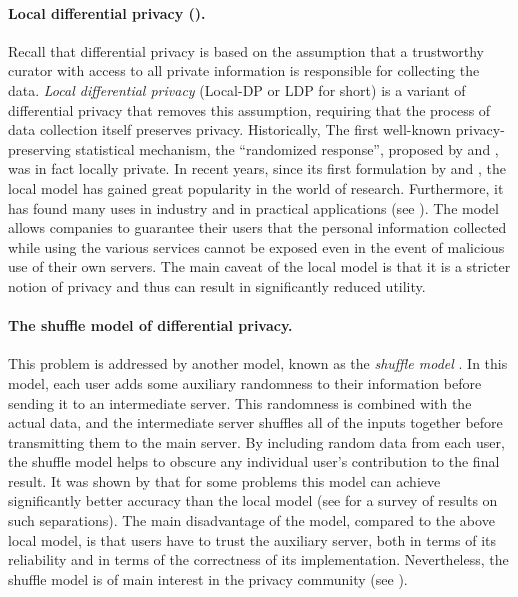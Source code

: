\documentclass[12pt,a4paper,oneside,onecolumn]{book}
\begin{document}
%
%

\paragraph{Local differential privacy (\citet{KLNRS08}).}
Recall that differential privacy is based on the assumption that a trustworthy curator with access to all private information is responsible for collecting the data. \emph{Local differential privacy} (Local-DP or LDP for short) is a variant of differential privacy that removes this assumption, requiring that the process of data collection itself preserves privacy. 
Historically, The first well-known privacy-preserving statistical mechanism, the “randomized response”, proposed by \citet{warner1965randomized} and \citet{greenberg1969unrelated}, was in fact locally private. 
In recent years, since its first formulation by \citet{10.1145/773153.773174} and \citet{KLNRS08}, the local model has gained great popularity in the world of research. 
Furthermore, it has found many uses in industry and in practical applications (see \citet{pmlr-v119-acharya20a, bureau_2021, erlingsson2014rappor, murakami2019utility}). 
The model allows companies to guarantee their users that the personal information collected while using the various services cannot be exposed even in the event of malicious use of their own servers. 
The main caveat of the local model is that it is a stricter notion of privacy and thus can result in significantly reduced utility.


\paragraph{The shuffle model of differential privacy.}
This problem is addressed by another model, known as the \emph{shuffle model} \citet{DBLP:journals/corr/abs-1808-01394, DBLP:journals/corr/abs-1710-00901, DBLP:journals/corr/abs-1811-12469}. 
% 
%
In this model, each user adds some auxiliary randomness to their information before sending it to an intermediate server. This randomness is combined with the actual data, and the intermediate server shuffles all of the inputs together before transmitting them to the main server. By including random data from each user, the shuffle model helps to obscure any individual user's contribution to the final result.
It was shown by \citet{DBLP:journals/corr/abs-1808-01394} that for some problems this model can achieve significantly better accuracy than the local model (see \citet{DBLP:journals/corr/abs-2107-11839} for a survey of results on such separations). 
The main disadvantage of the model, compared to the above local model, is that users have to trust the auxiliary server, both in terms of its reliability and in terms of the correctness of its implementation. 
Nevertheless, the shuffle model is of main interest in the privacy community (see \citet{Balle2020PrivateSI, Feldman2020HidingAT, Balle2019ThePB}).
\end{document}
